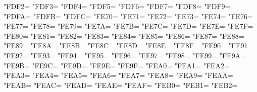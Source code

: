 \XeTeXcharclass"FDF2=\KclassArabU
\XeTeXcharclass"FDF3=\KclassArabU
\XeTeXcharclass"FDF4=\KclassArabU
\XeTeXcharclass"FDF5=\KclassArabU
\XeTeXcharclass"FDF6=\KclassArabU
\XeTeXcharclass"FDF7=\KclassArabU
\XeTeXcharclass"FDF8=\KclassArabU
\XeTeXcharclass"FDF9=\KclassArabU
\XeTeXcharclass"FDFA=\KclassArabU
\XeTeXcharclass"FDFB=\KclassArabU
\XeTeXcharclass"FDFC=\KclassArabU
\XeTeXcharclass"FE70=\KclassArabU
\XeTeXcharclass"FE71=\KclassArabU
\XeTeXcharclass"FE72=\KclassArabU
\XeTeXcharclass"FE73=\KclassArabU
\XeTeXcharclass"FE74=\KclassArabU
\XeTeXcharclass"FE76=\KclassArabU
\XeTeXcharclass"FE77=\KclassArabU
\XeTeXcharclass"FE78=\KclassArabU
\XeTeXcharclass"FE79=\KclassArabU
\XeTeXcharclass"FE7A=\KclassArabU
\XeTeXcharclass"FE7B=\KclassArabU
\XeTeXcharclass"FE7C=\KclassArabU
\XeTeXcharclass"FE7D=\KclassArabU
\XeTeXcharclass"FE7E=\KclassArabU
\XeTeXcharclass"FE7F=\KclassArabU
\XeTeXcharclass"FE80=\KclassArabU
\XeTeXcharclass"FE81=\KclassArabU
\XeTeXcharclass"FE82=\KclassArabU
\XeTeXcharclass"FE83=\KclassArabU
\XeTeXcharclass"FE84=\KclassArabU
\XeTeXcharclass"FE85=\KclassArabU
\XeTeXcharclass"FE86=\KclassArabU
\XeTeXcharclass"FE87=\KclassArabU
\XeTeXcharclass"FE88=\KclassArabU
\XeTeXcharclass"FE89=\KclassArabU
\XeTeXcharclass"FE8A=\KclassArabU
\XeTeXcharclass"FE8B=\KclassArabU
\XeTeXcharclass"FE8C=\KclassArabU
\XeTeXcharclass"FE8D=\KclassArabU
\XeTeXcharclass"FE8E=\KclassArabU
\XeTeXcharclass"FE8F=\KclassArabU
\XeTeXcharclass"FE90=\KclassArabU
\XeTeXcharclass"FE91=\KclassArabU
\XeTeXcharclass"FE92=\KclassArabU
\XeTeXcharclass"FE93=\KclassArabU
\XeTeXcharclass"FE94=\KclassArabU
\XeTeXcharclass"FE95=\KclassArabU
\XeTeXcharclass"FE96=\KclassArabU
\XeTeXcharclass"FE97=\KclassArabU
\XeTeXcharclass"FE98=\KclassArabU
\XeTeXcharclass"FE99=\KclassArabU
\XeTeXcharclass"FE9A=\KclassArabU
\XeTeXcharclass"FE9B=\KclassArabU
\XeTeXcharclass"FE9C=\KclassArabU
\XeTeXcharclass"FE9D=\KclassArabU
\XeTeXcharclass"FE9E=\KclassArabU
\XeTeXcharclass"FE9F=\KclassArabU
\XeTeXcharclass"FEA0=\KclassArabU
\XeTeXcharclass"FEA1=\KclassArabU
\XeTeXcharclass"FEA2=\KclassArabU
\XeTeXcharclass"FEA3=\KclassArabU
\XeTeXcharclass"FEA4=\KclassArabU
\XeTeXcharclass"FEA5=\KclassArabU
\XeTeXcharclass"FEA6=\KclassArabU
\XeTeXcharclass"FEA7=\KclassArabU
\XeTeXcharclass"FEA8=\KclassArabU
\XeTeXcharclass"FEA9=\KclassArabU
\XeTeXcharclass"FEAA=\KclassArabU
\XeTeXcharclass"FEAB=\KclassArabU
\XeTeXcharclass"FEAC=\KclassArabU
\XeTeXcharclass"FEAD=\KclassArabU
\XeTeXcharclass"FEAE=\KclassArabU
\XeTeXcharclass"FEAF=\KclassArabU
\XeTeXcharclass"FEB0=\KclassArabU
\XeTeXcharclass"FEB1=\KclassArabU
\XeTeXcharclass"FEB2=\KclassArabU
